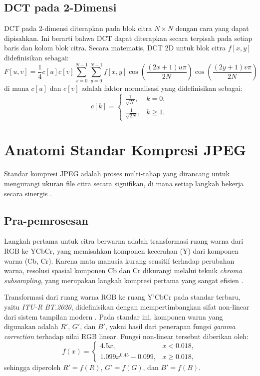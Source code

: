 \documentclass[a4paper]{article}
\begin{document}
\subsection{DCT pada 2-Dimensi}
DCT pada 2-dimensi diterapkan pada blok citra $N \times N$ dengan cara yang dapat dipisahkan. Ini berarti bahwa DCT dapat diterapkan secara terpisah pada setiap baris dan kolom blok citra. Secara matematis, DCT 2D untuk blok citra $f[x,y]$ didefinisikan sebagai:
\begin{equation} \label{eq:dct_2d}
  F[u,v] = \frac{1}{4} c[u] c[v] \sum_{x=0}^{N-1} \sum_{y=0}^{N-1} f[x,y] \cos\left(\frac{(2x+1)u\pi}{2N}\right) \cos\left(\frac{(2y+1)v\pi}{2N}\right)
\end{equation}
di mana $c[u]$ dan $c[v]$ adalah faktor normalisasi yang didefinisikan sebagai:
\begin{equation}
  c[k] =
  \begin{cases}
    \frac{1}{\sqrt{N}},  & k = 0,   \\[4pt]
    \frac{1}{\sqrt{2N}}, & k \ge 1.
  \end{cases}
\end{equation}

\section{Anatomi Standar Kompresi JPEG}
Standar kompresi JPEG adalah proses multi-tahap yang dirancang untuk mengurangi ukuran file citra secara signifikan, di mana setiap langkah bekerja secara sinergis \cite{wallace1991jpeg}.

\subsection{Pra-pemrosesan}
Langkah pertama untuk citra berwarna adalah transformasi ruang warna dari RGB ke YCbCr, yang memisahkan komponen kecerahan (Y) dari komponen warna (Cb, Cr). Karena mata manusia kurang sensitif terhadap perubahan warna, resolusi spasial komponen Cb dan Cr dikurangi melalui teknik \textit{chroma subsampling}, yang merupakan langkah kompresi pertama yang sangat efisien \cite{wallace1991jpeg}.

Transformasi dari ruang warna RGB ke ruang Y'CbCr pada standar terbaru, yaitu \textit{ITU-R BT.2020},
didefinisikan dengan mempertimbangkan sifat non-linear dari sistem tampilan modern \cite{itu2020}.
Pada standar ini, komponen warna yang digunakan adalah $R'$, $G'$, dan $B'$,
yakni hasil dari penerapan fungsi \textit{gamma correction} terhadap nilai RGB linear.
Fungsi non-linear tersebut diberikan oleh:
\begin{equation}
  f(x) =
  \begin{cases}
    4.5x,                  & x < 0.018,   \\[4pt]
    1.099x^{0.45} - 0.099, & x \ge 0.018,
  \end{cases}
\end{equation}
sehingga diperoleh $R' = f(R)$, $G' = f(G)$, dan $B' = f(B)$.
\end{document}
